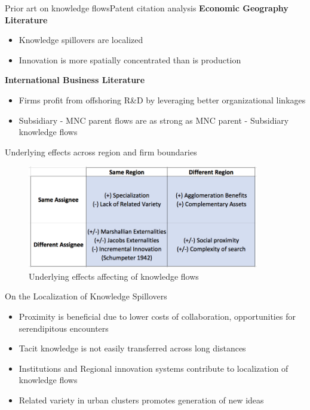 \documentclass{beamer}
\begin{document}
\begin{frame}{Prior art on knowledge flows}{Patent citation analysis}
\textbf{Economic Geography Literature}
\begin{itemize}
\item{Knowledge spillovers are localized \citep*{Jaffe1993}}
\item{Innovation is more spatially concentrated than is production \citep{Feldman1994a}}
\end{itemize}

\textbf{International Business Literature}
\begin{itemize}
\item{Firms profit from offshoring R\&D by leveraging better organizational linkages \citep*{Zhao2006}}
\item{Subsidiary - MNC parent flows are as strong as MNC parent - Subsidiary knowledge flows \citep{Singh2007}}
\end{itemize}
\end{frame}

\begin{frame}{Underlying effects across region and firm boundaries}
\begin{figure}[h!]
\begin{centering}
  \includegraphics[width=0.9\textwidth]{2x2effects}
  \caption{Underlying effects affecting of knowledge flows}
   \label{fig:2x2effects}
\end{centering}
\end{figure}
\end{frame}

\begin{frame}{On the Localization of Knowledge Spillovers}{}
\begin{itemize}
\item{Proximity is beneficial due to lower costs of collaboration, opportunities for serendipitous encounters}
\item{Tacit knowledge is not easily transferred across long distances}
\item{Institutions and Regional innovation systems contribute to localization of knowledge flows}
\item{Related variety \citep*{Boschma2009, Frenken2007, Jacobs1969} in urban clusters promotes generation of new ideas}
\end{itemize}
\end{frame}
\end{document}
